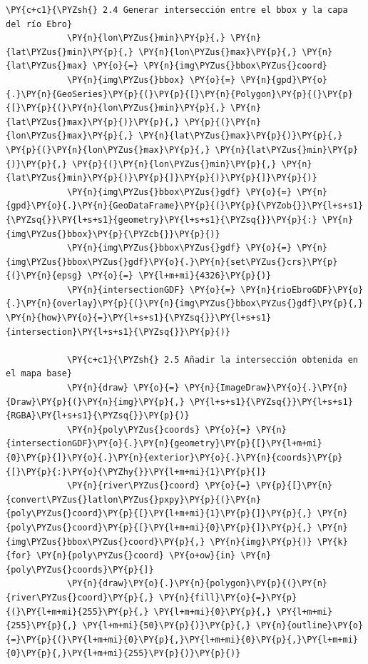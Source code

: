 \begin{tcolorbox}[breakable, size=fbox, boxrule=1pt, pad at break*=1mm,colback=cellbackground, colframe=cellborder, fontupper=\footnotesize]
\begin{Verbatim}[commandchars=\\\{\}]
            \PY{c+c1}{\PYZsh{} 2.4 Generar intersección entre el bbox y la capa del río Ebro}
            \PY{n}{lon\PYZus{}min}\PY{p}{,} \PY{n}{lat\PYZus{}min}\PY{p}{,} \PY{n}{lon\PYZus{}max}\PY{p}{,} \PY{n}{lat\PYZus{}max} \PY{o}{=} \PY{n}{img\PYZus{}bbox\PYZus{}coord}
            \PY{n}{img\PYZus{}bbox} \PY{o}{=} \PY{n}{gpd}\PY{o}{.}\PY{n}{GeoSeries}\PY{p}{(}\PY{p}{[}\PY{n}{Polygon}\PY{p}{(}\PY{p}{[}\PY{p}{(}\PY{n}{lon\PYZus{}min}\PY{p}{,} \PY{n}{lat\PYZus{}max}\PY{p}{)}\PY{p}{,} \PY{p}{(}\PY{n}{lon\PYZus{}max}\PY{p}{,} \PY{n}{lat\PYZus{}max}\PY{p}{)}\PY{p}{,} \PY{p}{(}\PY{n}{lon\PYZus{}max}\PY{p}{,} \PY{n}{lat\PYZus{}min}\PY{p}{)}\PY{p}{,} \PY{p}{(}\PY{n}{lon\PYZus{}min}\PY{p}{,} \PY{n}{lat\PYZus{}min}\PY{p}{)}\PY{p}{]}\PY{p}{)}\PY{p}{]}\PY{p}{)}
            \PY{n}{img\PYZus{}bbox\PYZus{}gdf} \PY{o}{=} \PY{n}{gpd}\PY{o}{.}\PY{n}{GeoDataFrame}\PY{p}{(}\PY{p}{\PYZob{}}\PY{l+s+s1}{\PYZsq{}}\PY{l+s+s1}{geometry}\PY{l+s+s1}{\PYZsq{}}\PY{p}{:} \PY{n}{img\PYZus{}bbox}\PY{p}{\PYZcb{}}\PY{p}{)}
            \PY{n}{img\PYZus{}bbox\PYZus{}gdf} \PY{o}{=} \PY{n}{img\PYZus{}bbox\PYZus{}gdf}\PY{o}{.}\PY{n}{set\PYZus{}crs}\PY{p}{(}\PY{n}{epsg} \PY{o}{=} \PY{l+m+mi}{4326}\PY{p}{)}
            \PY{n}{intersectionGDF} \PY{o}{=} \PY{n}{rioEbroGDF}\PY{o}{.}\PY{n}{overlay}\PY{p}{(}\PY{n}{img\PYZus{}bbox\PYZus{}gdf}\PY{p}{,} \PY{n}{how}\PY{o}{=}\PY{l+s+s1}{\PYZsq{}}\PY{l+s+s1}{intersection}\PY{l+s+s1}{\PYZsq{}}\PY{p}{)} 
            
            \PY{c+c1}{\PYZsh{} 2.5 Añadir la intersección obtenida en el mapa base}
            \PY{n}{draw} \PY{o}{=} \PY{n}{ImageDraw}\PY{o}{.}\PY{n}{Draw}\PY{p}{(}\PY{n}{img}\PY{p}{,} \PY{l+s+s1}{\PYZsq{}}\PY{l+s+s1}{RGBA}\PY{l+s+s1}{\PYZsq{}}\PY{p}{)}
            \PY{n}{poly\PYZus{}coords} \PY{o}{=} \PY{n}{intersectionGDF}\PY{o}{.}\PY{n}{geometry}\PY{p}{[}\PY{l+m+mi}{0}\PY{p}{]}\PY{o}{.}\PY{n}{exterior}\PY{o}{.}\PY{n}{coords}\PY{p}{[}\PY{p}{:}\PY{o}{\PYZhy{}}\PY{l+m+mi}{1}\PY{p}{]}
            \PY{n}{river\PYZus{}coord} \PY{o}{=} \PY{p}{[}\PY{n}{convert\PYZus{}latlon\PYZus{}pxpy}\PY{p}{(}\PY{n}{poly\PYZus{}coord}\PY{p}{[}\PY{l+m+mi}{1}\PY{p}{]}\PY{p}{,} \PY{n}{poly\PYZus{}coord}\PY{p}{[}\PY{l+m+mi}{0}\PY{p}{]}\PY{p}{,} \PY{n}{img\PYZus{}bbox\PYZus{}coord}\PY{p}{,} \PY{n}{img}\PY{p}{)} \PY{k}{for} \PY{n}{poly\PYZus{}coord} \PY{o+ow}{in} \PY{n}{poly\PYZus{}coords}\PY{p}{]}
            \PY{n}{draw}\PY{o}{.}\PY{n}{polygon}\PY{p}{(}\PY{n}{river\PYZus{}coord}\PY{p}{,} \PY{n}{fill}\PY{o}{=}\PY{p}{(}\PY{l+m+mi}{255}\PY{p}{,} \PY{l+m+mi}{0}\PY{p}{,} \PY{l+m+mi}{255}\PY{p}{,} \PY{l+m+mi}{50}\PY{p}{)}\PY{p}{,} \PY{n}{outline}\PY{o}{=}\PY{p}{(}\PY{l+m+mi}{0}\PY{p}{,}\PY{l+m+mi}{0}\PY{p}{,}\PY{l+m+mi}{0}\PY{p}{,}\PY{l+m+mi}{255}\PY{p}{)}\PY{p}{)}
    

\end{Verbatim}
\end{tcolorbox}
